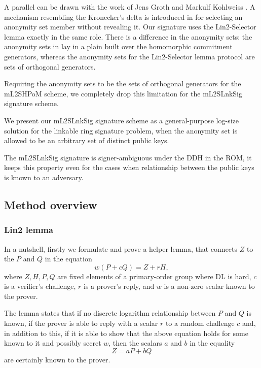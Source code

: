 \documentclass{mathcryptology} %
\theoremstyle{title}
\theoremstyle{titleof}
\begin{document}
    A parallel can be drawn with the work of Jens Groth and Markulf Kohlweiss \cite{9}. A mechanism resembling the Kronecker's delta is introduced in \cite{9} for selecting an anonymity set member without revealing it. Our signature uses the Lin2-Selector lemma exactly in the same role. There is a difference in the anonymity sets: the anonymity sets in \cite{9} lay in a plain built over the homomorphic commitment generators, whereas the anonymity sets for the Lin2-Selector lemma protocol are sets of orthogonal generators.

    Requiring the anonymity sets to be the sets of orthogonal generators for the mL2SHPoM scheme, we completely drop this limitation for the mL2SLnkSig signature scheme.

    We present our mL2SLnkSig signature scheme as a general-purpose log-size solution for the linkable ring signature problem, when the anonymity set is allowed to be an arbitrary set of distinct public keys.
    
    The mL2SLnkSig signature is signer-ambiguous under the DDH in the ROM, it keeps this property even for the cases when relationship between the public keys is known to an adversary.


\subsection{Method overview}

\subsubsection{Lin2 lemma}
    In a nutshell, firstly we formulate and prove a helper lemma, that connects $Z$ to the $P$ and $Q$ in the equation
    \begin{equation*}
        w(P+cQ)=Z+rH,
    \end{equation*}     
    where $Z, H, P, Q$ are fixed elements of a primary-order group where DL is hard, $c$ is a verifier's challenge, $r$ is a prover's reply, and $w$ is a non-zero scalar known to the prover.
    
    The lemma states that if no discrete logarithm relationship between $P$ and $Q$ is known, if the prover is able to reply with a scalar $r$ to a random challenge $c$ and, in addition to this, if it is able to show that the above equation holds for some known to it and possibly secret $w$, then the scalars $a$ and $b$ in the equality
    \begin{equation*}
        Z=aP+bQ
    \end{equation*}
    are certainly known to the prover.
\end{document}
